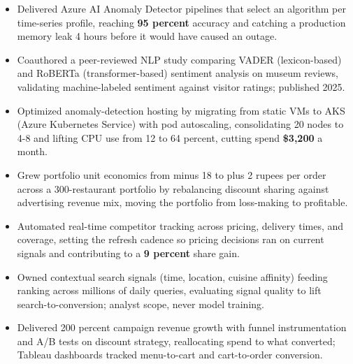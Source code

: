 \documentclass[letterpaper,10pt]{article}
\begin{document}
\begin{itemize}
\item Delivered Azure AI Anomaly Detector pipelines that select an algorithm per time-series profile, reaching \textbf{95 percent} accuracy and catching a production memory leak 4 hours before it would have caused an outage.
\item Coauthored a peer-reviewed NLP study comparing VADER (lexicon-based) and RoBERTa (transformer-based) sentiment analysis on museum reviews, validating machine-labeled sentiment against visitor ratings; published 2025.
\item Optimized anomaly-detection hosting by migrating from static VMs to AKS (Azure Kubernetes Service) with pod autoscaling, consolidating 20 nodes to 4-8 and lifting CPU use from 12 to 64 percent, cutting spend \textbf{\$3,200} a month.
\end{itemize}

\begin{itemize}
\item Grew portfolio unit economics from minus 18 to plus 2 rupees per order across a 300-restaurant portfolio by rebalancing discount sharing against advertising revenue mix, moving the portfolio from loss-making to profitable.
\item Automated real-time competitor tracking across pricing, delivery times, and coverage, setting the refresh cadence so pricing decisions ran on current signals and contributing to a \textbf{9 percent} share gain.
\item Owned contextual search signals (time, location, cuisine affinity) feeding ranking across millions of daily queries, evaluating signal quality to lift search-to-conversion; analyst scope, never model training.
\item Delivered 200 percent campaign revenue growth with funnel instrumentation and A/B tests on discount strategy, reallocating spend to what converted; Tableau dashboards tracked menu-to-cart and cart-to-order conversion.
\end{itemize}
\end{document}
